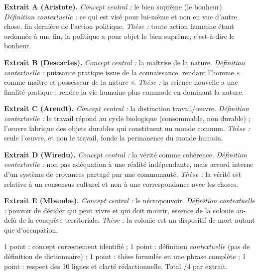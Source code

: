 \documentclass[11pt]{article}
\newcommand{\cle}[1]{{\popxbold\color{popdark}#1}}
\begin{document}
\begin{corrige}
\textbf{Extrait A (Aristote).} \emph{Concept central :} le \cle{bien suprême} (le bonheur). \emph{Définition contextuelle :} ce qui est visé pour lui-même et non en vue d'autre chose, fin dernière de l'action politique. \emph{Thèse :} toute action humaine étant ordonnée à une fin, la politique a pour objet le bien suprême, c'est-à-dire le bonheur.

\textbf{Extrait B (Descartes).} \emph{Concept central :} la \cle{maîtrise de la nature}. \emph{Définition contextuelle :} puissance pratique issue de la connaissance, rendant l'homme « comme maître et possesseur de la nature ». \emph{Thèse :} la science nouvelle a une finalité pratique : rendre la vie humaine plus commode en dominant la nature.

\textbf{Extrait C (Arendt).} \emph{Concept central :} la distinction \cle{travail}/\cle{œuvre}. \emph{Définition contextuelle :} le travail répond au cycle biologique (consommable, non durable) ; l'œuvre fabrique des objets durables qui constituent un monde commun. \emph{Thèse :} seule l'œuvre, et non le travail, fonde la permanence du monde humain.

\textbf{Extrait D (Wiredu).} \emph{Concept central :} la \cle{vérité comme cohérence}. \emph{Définition contextuelle :} non pas adéquation à une réalité indépendante, mais accord interne d'un système de croyances partagé par une communauté. \emph{Thèse :} la vérité est relative à un consensus culturel et non à une correspondance avec les choses.

\textbf{Extrait E (Mbembe).} \emph{Concept central :} le \cle{nécropouvoir}. \emph{Définition contextuelle :} pouvoir de décider qui peut vivre et qui doit mourir, essence de la colonie au-delà de la conquête territoriale. \emph{Thèse :} la colonie est un dispositif de mort autant que d'occupation.
\end{corrige}

\begin{methode}
1 point : concept correctement identifié ; 1 point : définition \emph{contextuelle} (pas de définition de dictionnaire) ; 1 point : thèse formulée en une phrase complète ; 1 point : respect des 10 lignes et clarté rédactionnelle. Total /4 par extrait.
\end{methode}
\end{document}

